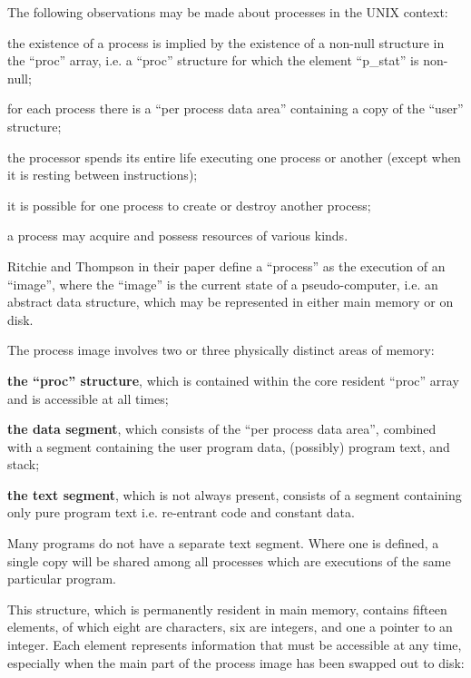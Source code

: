 The following observations may be made
about processes in the UNIX context:

\bd
\item[(a)] the existence of a process is
implied by the existence of a
non-null structure in the ``proc''
array, i.e. a ``proc'' structure
for which the element ``p\_stat''
is non-null;

\item[(b)] for each process there is a ``per
process data area'' containing a
copy of the ``user'' structure;

\item[(c)] the processor spends its entire
life executing one process or
another (except when it is resting between instructions);

\item[(d)] it is possible for one process
to create or destroy another
process;

\item[(e)] a process may acquire and possess resources of various kinds.
\ed



Ritchie and Thompson in their paper
define a ``process'' as the execution of
an ``image'', where the ``image'' is the
current state of a pseudo-computer,
i.e. an abstract data structure, which
may be represented in either main
memory or on disk.


The process image involves two or three
physically distinct areas of memory:

\bd
\item[(1)] {\bf the ``proc'' structure}, which is
 contained within the core
 resident ``proc'' array and is
 accessible at all times;

\item[(2)] {\bf the data segment}, which consists of the ``per process data
area'', combined with a segment
containing the user program
data, (possibly) program text,
and stack;

\item[(3)] {\bf the text segment}, which is not
always present, consists of a
segment containing only pure
program text i.e. re-entrant
code and constant data.
\ed

Many programs do not have a separate
text segment. Where one is defined, a
single copy will be shared among all
processes which are executions of the
same particular program.



This structure, which is permanently
resident in main memory, contains fifteen
elements, of which eight are characters, six are integers, and one a
pointer to an integer. Each element
represents information that must be
accessible at any time, especially when
the main part of the process image has
been swapped out to disk:

